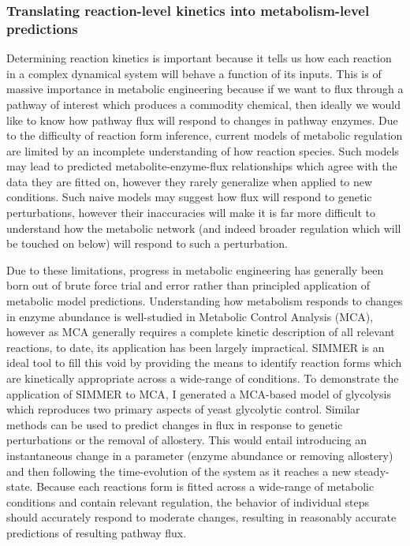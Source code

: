 \subsubsection{Translating reaction-level kinetics into metabolism-level predictions}

Determining reaction kinetics is important because it tells us how each reaction in a complex dynamical system will behave a function of its inputs. This is of massive importance in metabolic engineering because if we want to flux through a pathway of interest which produces a commodity chemical, then ideally we would like to know how pathway flux will respond to changes in pathway enzymes. Due to the difficulty of reaction form inference, current models of metabolic regulation are limited by an incomplete understanding of how reaction species. Such models may lead to predicted metabolite-enzyme-flux relationships which agree with the data they are fitted on, however they rarely generalize when applied to new conditions. Such naive models may suggest how flux will respond to genetic perturbations, however their inaccuracies will make it is far more difficult to understand how the metabolic network (and indeed broader regulation which will be touched on below) will respond to such a perturbation. 

Due to these limitations, progress in metabolic engineering has generally been born out of brute force trial and error rather than principled application of metabolic model predictions. Understanding how metabolism responds to changes in enzyme abundance is well-studied in Metabolic Control Analysis (MCA), however as MCA generally requires a complete kinetic description of all relevant reactions, to date, its application has been largely impractical. SIMMER is an ideal tool to fill this void by providing the means to identify reaction forms which are kinetically appropriate across a wide-range of conditions. To demonstrate the application of SIMMER to MCA, I generated a MCA-based model of glycolysis which reproduces two primary aspects of yeast glycolytic control. Similar methods can be used to predict changes in flux in response to genetic perturbations or the removal of allostery. This would entail introducing an instantaneous change in a parameter (enzyme abundance or removing allostery) and then following the time-evolution of the system as it reaches a new steady-state. Because each reactions form is fitted across a wide-range of metabolic conditions and contain relevant regulation, the behavior of individual steps should accurately respond to moderate changes, resulting in reasonably accurate predictions of resulting pathway flux.


